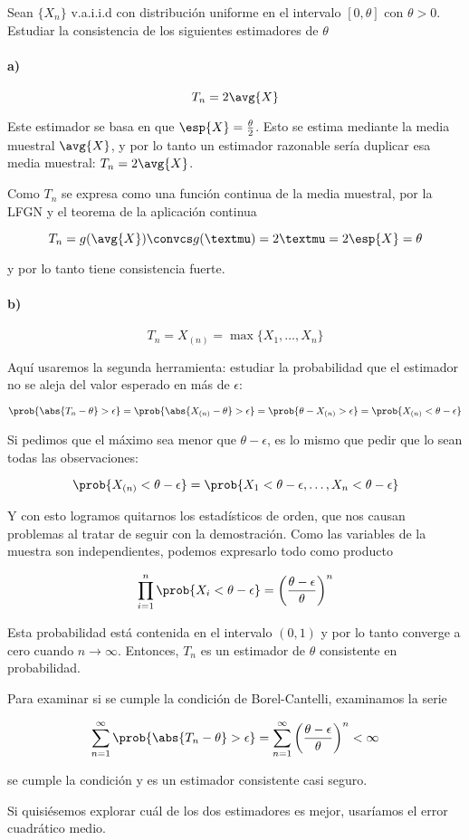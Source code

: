\documentclass{apuntes}
\begin{document}
\begin{example} Sean $\{X_n\}$ v.a.i.i.d con distribución uniforme en el intervalo $[0,\theta]$ con $\theta > 0$. Estudiar la consistencia de los siguientes estimadores de $\theta$

\paragraph{a)}

\[ T_n = 2\avg{X} \]

Este estimador se basa en que $\esp{X} = \frac{\theta}{2}$. Esto se estima mediante la media muestral $\avg{X}$, y por lo tanto un estimador razonable sería duplicar esa media muestral: $T_n = 2 \avg{X}$.

Como $T_n$ se expresa como una función continua de la media muestral, por la LFGN y el teorema de la aplicación continua 

\[ T_n = g(\avg{X}) \convcs g(µ) = 2µ = 2\esp{X} = \theta \]

y por lo tanto tiene consistencia fuerte.

\paragraph{b)}

\[ T_n=X_{(n)} = \max \{ X_1,\dotsc,X_n\} \]

Aquí usaremos la segunda herramienta: estudiar la probabilidad que el estimador no se aleja del valor esperado en más de $\epsilon$:

\[ \prob{\abs{T_n - \theta} > \epsilon} = \prob{\abs{X_{(n)} - \theta} > \epsilon} = \prob{\theta - X_{(n)} > \epsilon} = \prob{X_{(n)} < \theta - \epsilon} \]

Si pedimos que el máximo sea menor que $\theta - \epsilon$, es lo mismo que pedir que lo sean todas las observaciones:

\[ \prob{X_{(n)} < \theta - \epsilon} = \prob{X_1 < \theta - \epsilon, \dotsc , X_n < \theta - \epsilon} \]

Y con esto logramos quitarnos los estadísticos de orden, que nos causan problemas al tratar de seguir con la demostración. Como las variables de la muestra son independientes, podemos expresarlo todo como producto

\[ \prod_{i=1}^n \prob{X_i < \theta - \epsilon} = \left(\frac{\theta - \epsilon}{\theta}\right)^n \]

Esta probabilidad está contenida en el intervalo $(0, 1)$ y por lo tanto converge a cero cuando $n\to \infty$. Entonces, $T_n$ es un estimador de $\theta$ consistente en probabilidad.

Para examinar si se cumple la condición de Borel-Cantelli, examinamos la serie 

\[ \sum_{n=1}^\infty \prob{\abs{T_n - \theta} > \epsilon} = \sum_{n=1}^\infty \left(\frac{\theta - \epsilon}{\theta}\right)^n < \infty \]

se cumple la condición y es un estimador consistente casi seguro.

Si quisiésemos explorar cuál de los dos estimadores es mejor, usaríamos el error cuadrático medio.

\end{example}
\end{document}
